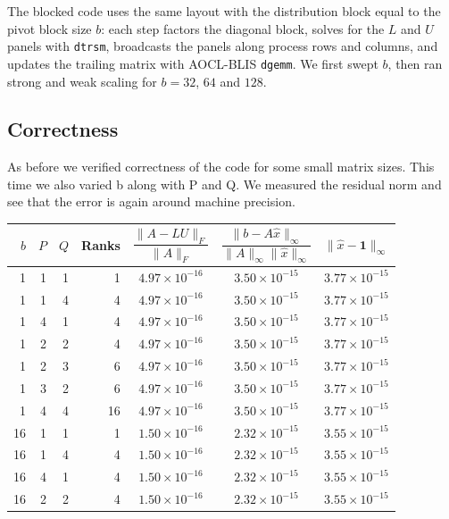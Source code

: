 \documentclass[11pt]{article}
\begin{document}
The blocked code uses the same layout with the distribution block equal to the pivot block size $b$: each step factors the diagonal block, solves for the $L$ and $U$ panels with \texttt{dtrsm}, broadcasts the panels along process rows and columns, and updates the trailing matrix with AOCL-BLIS \texttt{dgemm}. We first swept $b$, then ran strong and weak scaling for $b=32$, $64$ and $128$.

\subsection{Correctness}
As before we verified correctness of the code for some small matrix sizes. This time we also varied b along with P and Q.
We measured the residual norm and see that the error is again around machine precision.
\begin{table}
\centering
  \begin{tabular}{rrrr ccc}
    \toprule
    $b$ & $P$ & $Q$ & Ranks &
    $\dfrac{\|A - LU\|_F}{\|A\|_F}$ &
    $\dfrac{\|b - A\hat{x}\|_\infty}{\|A\|_\infty \|\hat{x}\|_\infty}$ &
    $\|\hat{x} - \mathbf{1}\|_\infty$ \\
    \midrule
     1 & 1 & 1 &  1 & $4.97\times10^{-16}$ & $3.50\times10^{-15}$ & $3.77\times10^{-15}$ \\
     1 & 1 & 4 &  4 & $4.97\times10^{-16}$ & $3.50\times10^{-15}$ & $3.77\times10^{-15}$ \\
     1 & 4 & 1 &  4 & $4.97\times10^{-16}$ & $3.50\times10^{-15}$ & $3.77\times10^{-15}$ \\
     1 & 2 & 2 &  4 & $4.97\times10^{-16}$ & $3.50\times10^{-15}$ & $3.77\times10^{-15}$ \\
     1 & 2 & 3 &  6 & $4.97\times10^{-16}$ & $3.50\times10^{-15}$ & $3.77\times10^{-15}$ \\
     1 & 3 & 2 &  6 & $4.97\times10^{-16}$ & $3.50\times10^{-15}$ & $3.77\times10^{-15}$ \\
     1 & 4 & 4 & 16 & $4.97\times10^{-16}$ & $3.50\times10^{-15}$ & $3.77\times10^{-15}$ \\
    \midrule
    16 & 1 & 1 &  1 & $1.50\times10^{-16}$ & $2.32\times10^{-15}$ & $3.55\times10^{-15}$ \\
    16 & 1 & 4 &  4 & $1.50\times10^{-16}$ & $2.32\times10^{-15}$ & $3.55\times10^{-15}$ \\
    16 & 4 & 1 &  4 & $1.50\times10^{-16}$ & $2.32\times10^{-15}$ & $3.55\times10^{-15}$ \\
    16 & 2 & 2 &  4 & $1.50\times10^{-16}$ & $2.32\times10^{-15}$ & $3.55\times10^{-15}$ \\

\end{tabular}
\end{table}
\end{document}
